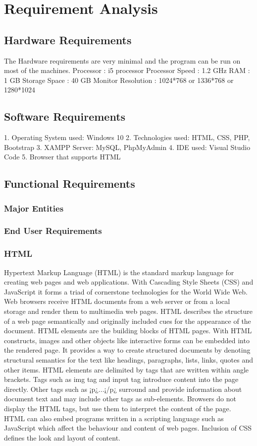 \chapter{Requirement Analysis}
\thispagestyle{special}
\section{ Hardware Requirements }
The Hardware requirements are very minimal and the program can be run on most of the machines.
Processor : i5 processor
Processor Speed : 1.2 GHz
RAM : 1 GB
Storage Space : 40 GB
Monitor Resolution : 1024*768 or 1336*768 or 1280*1024
\section{ Software Requirements}
1. Operating System used: Windows 10
2. Technologies used: HTML, CSS, PHP, Bootstrap
3. XAMPP Server: MySQL, PhpMyAdmin
4. IDE used: Visual Studio Code
5. Browser that supports HTML
\section{Functional Requirements}
\subsection{Major Entities}
\subsection{End User Requirements}
\subsection{HTML}
Hypertext Markup Language (HTML) is the standard markup language for creating web pages and
web applications. With Cascading Style Sheets (CSS) and JavaScript it forms a triad of cornerstone
technologies for the World Wide Web. Web browsers receive HTML documents from a web server
or from a local storage and render them to multimedia web pages. HTML describes the structure of a
web page semantically and originally included cues for the appearance of the document.
HTML elements are the building blocks of HTML pages. With HTML constructs, images and
other objects like interactive forms can be embedded into the rendered page. It provides a way to
create structured documents by denoting structural semantics for the text like headings, paragraphs,
lists, links, quotes and other items. HTML elements are delimited by tags that are written within
angle brackets. Tags such as img tag and input tag introduce content into the page directly. Other tags
such as ¡p¿...¡/p¿ surround and provide information about document text and may include other tags
as sub-elements. Browsers do not display the HTML tags, but use them to interpret the content of the
page.
HTML can also embed programs written in a scripting language such as JavaScript which affect
the behaviour and content of web pages. Inclusion of CSS defines the look and layout of content.
